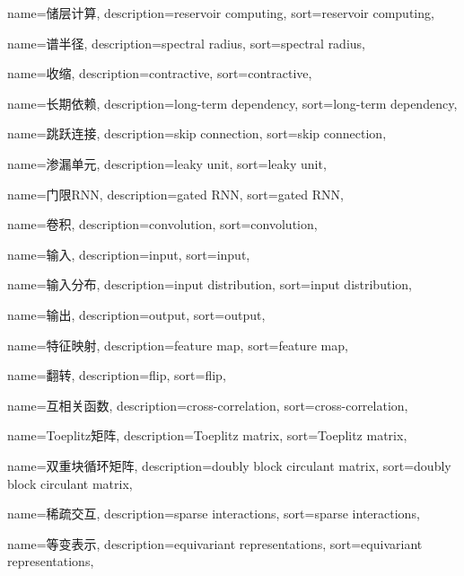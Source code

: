 {
  name=储层计算,
  description={reservoir computing},
  sort={reservoir computing},
}

{
  name=谱半径,
  description={spectral radius},
  sort={spectral radius},
}

{
  name=收缩,
  description={contractive},
  sort={contractive},
}

{
  name=长期依赖,
  description={long-term dependency},
  sort={long-term dependency},
}

{
  name=跳跃连接,
  description={skip connection},
  sort={skip connection},
}

{
  name=渗漏单元,
  description={leaky unit},
  sort={leaky unit},
}

{
  name=门限RNN,
  description={gated RNN},
  sort={gated RNN},
}

{
  name=卷积,
  description={convolution},
  sort={convolution},
}

{
  name=输入,
  description={input},
  sort={input},
}

{
  name=输入分布,
  description={input distribution},
  sort={input distribution},
}

{
  name=输出,
  description={output},
  sort={output},
}

{
  name=特征映射,
  description={feature map},
  sort={feature map},
}

{
  name=翻转,
  description={flip},
  sort={flip},
}

{
  name=互相关函数,
  description={cross-correlation},
  sort={cross-correlation},
}

{
  name=Toeplitz矩阵,
  description={Toeplitz matrix},
  sort={Toeplitz matrix},
}

{
  name=双重块循环矩阵,
  description={doubly block circulant matrix},
  sort={doubly block circulant matrix},
}

{
  name=稀疏交互,
  description={sparse interactions},
  sort={sparse interactions},
}

{
  name=等变表示,
  description={equivariant representations},
  sort={equivariant representations},
}

